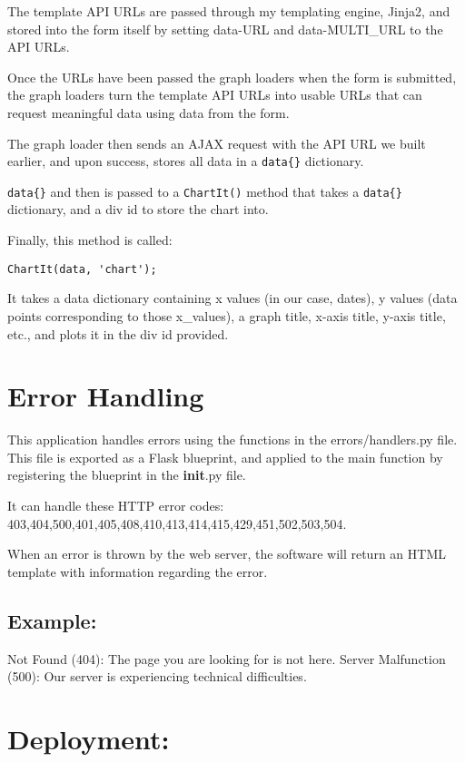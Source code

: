 The template API URLs are passed through my templating engine, Jinja2,
and stored into the form itself by setting data-URL and data-MULTI\_URL
to the API URLs.

Once the URLs have been passed the graph loaders when the form is
submitted, the graph loaders turn the template API URLs into usable URLs
that can request meaningful data using data from the form.

The graph loader then sends an AJAX request with the API URL we built
earlier, and upon success, stores all data in a \texttt{data\{\}}
dictionary.

\texttt{data\{\}} and then is passed to a \texttt{ChartIt()} method that
takes a \texttt{data\{\}} dictionary, and a div id to store the chart
into.

Finally, this method is called:

\begin{verbatim}
ChartIt(data, 'chart');
\end{verbatim}

It takes a data dictionary containing x values (in our case, dates), y
values (data points corresponding to those x\_values), a graph title,
x-axis title, y-axis title, etc., and plots it in the div id provided.

\section{Error Handling}\label{error-handling}

This application handles errors using the functions in the
errors/handlers.py file. This file is exported as a Flask blueprint, and
applied to the main function by registering the blueprint in the
\textbf{init}.py file.

It can handle these HTTP error codes:
403,404,500,401,405,408,410,413,414,415,429,451,502,503,504.

When an error is thrown by the web server, the software will return an
HTML template with information regarding the error.

\subsection{Example:}\label{example}

Not Found (404): The page you are looking for is not here. Server
Malfunction (500): Our server is experiencing technical difficulties.

\section{Deployment:}\label{deployment}

